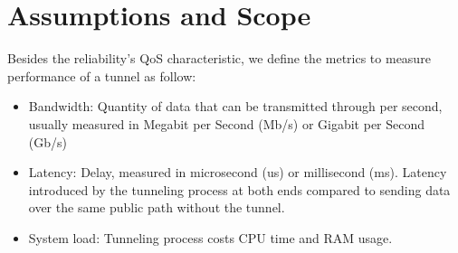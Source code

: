 







\section{Assumptions and Scope}

Besides the reliability's \ac{QoS} characteristic, we define the metrics to measure performance of a tunnel as follow:
\begin{itemize}
    \item Bandwidth: Quantity of data that can be transmitted through per second, usually measured in Megabit per Second (Mb/s) or Gigabit  per Second (Gb/s)
    \item Latency: Delay, measured in microsecond (us) or millisecond (ms). Latency introduced by the tunneling process at both ends compared to sending data over the same public path without the tunnel.
    \item System load: Tunneling process costs CPU time and RAM usage.
\end{itemize}

